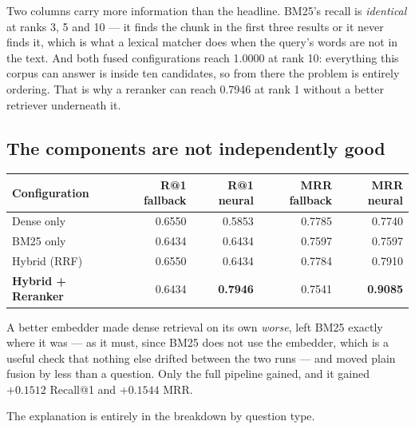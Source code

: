 \documentclass[11pt,a4paper]{article}
\begin{document}
Two columns carry more information than the headline. BM25's recall is
\emph{identical} at ranks 3, 5 and 10 --- it finds the chunk in the first three
results or it never finds it, which is what a lexical matcher does when the
query's words are not in the text. And both fused configurations reach 1.0000 at
rank 10: everything this corpus can answer is inside ten candidates, so from
there the problem is entirely ordering. That is why a reranker can reach 0.7946
at rank 1 without a better retriever underneath it.

\subsection{The components are not independently good}

\begin{center}
\small
\begin{tabular}{@{}lrrrr@{}}
\toprule
\textbf{Configuration} & \textbf{R@1 fallback} & \textbf{R@1 neural} & \textbf{MRR fallback} & \textbf{MRR neural} \\
\midrule
Dense only   & 0.6550 & 0.5853 & 0.7785 & 0.7740 \\
BM25 only    & 0.6434 & 0.6434 & 0.7597 & 0.7597 \\
Hybrid (RRF) & 0.6550 & 0.6434 & 0.7784 & 0.7910 \\
\textbf{Hybrid + Reranker} & 0.6434 & \textbf{0.7946} & 0.7541 & \textbf{0.9085} \\
\bottomrule
\end{tabular}
\end{center}

A better embedder made dense retrieval on its own \emph{worse}, left BM25 exactly
where it was --- as it must, since BM25 does not use the embedder, which is a
useful check that nothing else drifted between the two runs --- and moved plain
fusion by less than a question. Only the full pipeline gained, and it gained
$+0.1512$ Recall@1 and $+0.1544$ MRR.

The explanation is entirely in the breakdown by question type.
\end{document}
